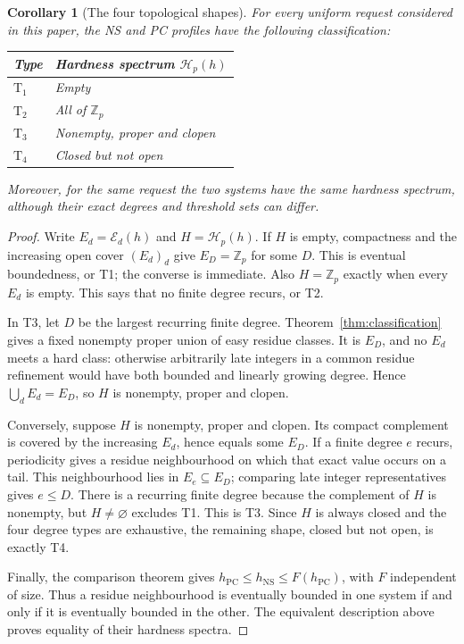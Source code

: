 \documentclass[11pt,a4paper]{article}
\newtheorem{corollary}[theorem]{Corollary}
\theoremstyle{definition}\newtheorem{definition}[theorem]{Definition}
\theoremstyle{remark}\newtheorem{remark}[theorem]{Remark}
\newcommand{\NS}{\mathrm{NS}}\newcommand{\PC}{\mathrm{PC}}
\begin{document}
\begin{samepage}
\begin{corollary}[The four topological shapes]
\label{cor:topological-spectrum}
For every uniform request considered in this paper, the NS and PC
profiles have the following classification:
\begin{center}
\begin{tabular}{@{}ll@{}}
\toprule
Type & Hardness spectrum $\mathcal H_p(h)$\\
\midrule
$\mathrm T_1$ & Empty\\
$\mathrm T_2$ & All of $\mathbb Z_p$\\
$\mathrm T_3$ & Nonempty, proper and clopen\\
$\mathrm T_4$ & Closed but not open\\
\bottomrule
\end{tabular}
\end{center}
Moreover, for the same request the two systems have the same hardness
spectrum, although their exact degrees and threshold sets can differ.
\end{corollary}
\end{samepage}
\begin{proof}
Write $E_d=\mathcal E_d(h)$ and $H=\mathcal H_p(h)$. If $H$ is empty,
compactness and the increasing open cover $(E_d)_d$ give
$E_D=\mathbb Z_p$ for some $D$. This is eventual boundedness, or T1;
the converse is immediate. Also $H=\mathbb Z_p$ exactly when every
$E_d$ is empty. This says that no finite degree recurs, or T2.

In T3, let $D$ be the largest recurring finite degree.
Theorem~\ref{thm:classification} gives a fixed nonempty proper union
of easy residue classes. It is $E_D$, and no $E_d$ meets a hard class:
otherwise arbitrarily late integers in a common residue refinement
would have both bounded and linearly growing degree. Hence
$\bigcup_dE_d=E_D$, so $H$ is nonempty, proper and clopen.

Conversely, suppose $H$ is nonempty, proper and clopen. Its compact
complement is covered by the increasing $E_d$, hence equals some $E_D$.
If a finite degree $e$ recurs, periodicity gives a residue neighbourhood
on which that exact value occurs on a tail. This neighbourhood lies
in $E_e\subseteq E_D$; comparing late integer representatives gives
$e\le D$. There is a recurring finite degree because the complement
of $H$ is nonempty, but $H\ne\varnothing$ excludes T1. This is T3.
Since $H$ is always closed and the four degree types are exhaustive,
the remaining shape, closed but not open, is exactly T4.

Finally, the comparison theorem gives
$h_{\PC}\le h_{\NS}\le F(h_{\PC})$, with $F$ independent of size.
Thus a residue neighbourhood is eventually bounded in one system if
and only if it is eventually bounded in the other. The equivalent
description above proves equality of their hardness spectra.
\end{proof}
\end{document}
